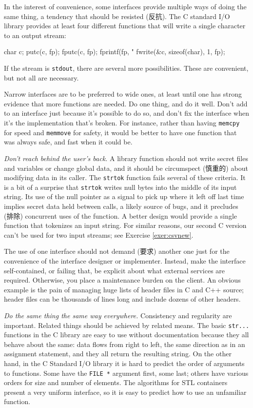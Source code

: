 In the interest of convenience, some interfaces provide multiple ways of
doing the same thing, a tendency that should be resisted (反抗). The C
standard I/O library provides at least four different functions that will
write a single character to an output stream:
\begin{wellcode}
    char    c;
    putc(c, fp);
    fputc(c, fp);
    fprintf(fp, "%
    fwrite(&c, sizeof(char), 1, fp);
\end{wellcode}
If the stream is \verb'stdout', there are several more possibilities. These
are convenient, but not all are necessary.

Narrow interfaces are to be preferred to wide ones, at least until one has
strong evidence that more functions are needed. Do one thing, and do it
well.  Don't add to an interface just because it's possible to do so, and
don't fix the interface when it's the implementation that's broken. For
instance, rather than having \verb'memcpy' for speed and \verb'memmove' for
safety, it would be better to have one function that was always safe, and
fast when it could be.

\emph{Don't reach behind the user's back.} A library function should not
write secret files and variables or change global data, and it should be
circumspect (慎重的) about modifying data in its caller. The \verb'strtok'
function fails several of these criteria. It is a bit of a surprise that
\verb'strtok' writes null bytes into the middle of its input string. Its
use of the null pointer as a signal to pick up where it left off last time
implies secret data held between calls, a likely source of bugs, and it
precludes (排除) concurrent uses of the function. A better design would
provide a single function that tokenizes an input string.  For similar
reasons, our second C version can't be used for two input streams; see
Exercise \ref{exer:csvnew}.

The use of one interface should not demand (要求) another one just for the
convenience of the interface designer or implementer. Instead, make the
interface self-contained, or failing that, be explicit about what external
services are required.  Otherwise, you place a maintenance burden on the
client. An obvious example is the pain of managing huge lists of header
files in C and C++ source; header files can be thousands of lines long and
include dozens of other headers.

\emph{Do the same thing the same way everywhere.} Consistency and
regularity are important. Related things should be achieved by related
means. The basic \verb'str...' functions in the C library are easy to use
without documentation because they all behave about the same: data flows
from right to left, the same direction as in an assignment statement, and
they all return the resulting string. On the other hand, in the C Standard
I/O library it is hard to predict the order of arguments to functions.
Some have the \verb'FILE *' argument first, some last; others have various
orders for size and number of elements. The algorithms for STL containers
present a very uniform interface, so it is easy to predict how to use an
unfamiliar function.

